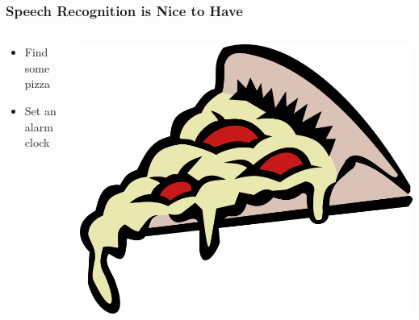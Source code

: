\documentclass[pdflatex,compress]{beamer}
\begin{document}
\begin{frame}
  \frametitle{Speech Recognition is Nice to Have}
  \begin{columns}[onlytextwidth]
    \begin{column}{0.6\textwidth}
      \begin{itemize}
      \item Find some pizza
      \item Set an alarm clock
      \end{itemize}
    \end{column}
    \begin{column}{0.4\textwidth}
      \centering
      \vspace{-.25cm}
      \includegraphics[scale=.125]{pizza.png}\\
      \vspace{.10cm}

\end{column}
\end{columns}
\end{frame}
\end{document}
